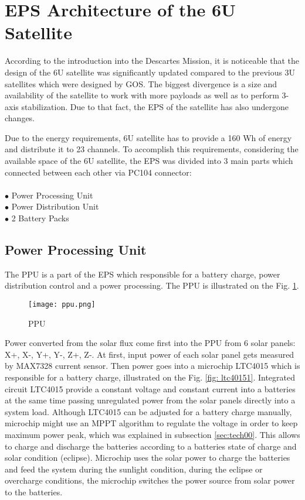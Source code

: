  
  \section{EPS Architecture of the 6U Satellite}
  According to the introduction into the  Descartes Mission, it is noticeable that the design of the 6U satellite was significantly updated compared to the previous 3U satellites which were designed by GOS. The biggest divergence is a size and availability of the satellite to work with more payloads as well as to perform 3-axis stabilization. Due to that fact, the EPS of the satellite has also undergone changes.
  
  Due to the energy requirements, 6U satellite has to provide a 160 Wh of energy and  distribute it to 23 channels. To accomplish this requirements, considering the available space of the 6U satellite, the EPS was divided into 3 main parts which connected between each other via PC104 connector:\\ \\
  $\bullet$ Power Processing Unit\\
  $\bullet$ Power Distribution Unit\\
  $\bullet$ 2 Battery Packs\\
  
   \subsection{Power Processing Unit}
   The PPU is a part of the EPS which responsible for a battery charge, power distribution control and a power processing. The PPU is illustrated on the Fig. \ref{fig: psu122}.
   
   \begin{figure}[h]
   	\centering
   	\texttt{[image: ppu.png]}
   	\caption{PPU}
   	\label{fig: psu122}
   \end{figure}
   
   Power converted from the solar flux come first into the PPU from 6 solar panels: X+, X-, Y+, Y-, Z+, Z-. At first, input power of each solar panel gets measured by MAX7328 current sensor. Then power goes into a microchip LTC4015 which is responsible for a battery charge, illustrated on the Fig. \ref{fig: ltc40151}. Integrated circuit LTC4015 provide a constant voltage and constant current into a batteries at the same time passing unregulated power from the solar panels directly into a system load. Although LTC4015 can be adjusted for a battery charge manually, microchip might use an MPPT algorithm to regulate the voltage in order to keep maximum power peak, which was explained in subsection \ref{sec:tech00}. This allows to charge and discharge the batteries according to a batteries state of charge and solar condition (eclipse). Microchip uses the solar power to charge the batteries and feed the system  during the sunlight condition, during the eclipse or overcharge conditions, the microchip switches the power source from solar power to the batteries.
   
